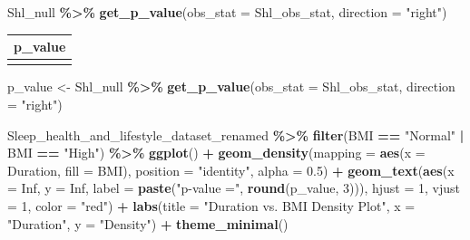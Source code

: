 \documentclass[
  11pt,
]{article}
\newenvironment{Shaded}{\begin{snugshade}}{\end{snugshade}}
\newcommand{\AttributeTok}[1]{\textcolor[rgb]{0.13,0.29,0.53}{#1}}
\newcommand{\ConstantTok}[1]{\textcolor[rgb]{0.56,0.35,0.01}{#1}}
\newcommand{\DecValTok}[1]{\textcolor[rgb]{0.00,0.00,0.81}{#1}}
\newcommand{\FloatTok}[1]{\textcolor[rgb]{0.00,0.00,0.81}{#1}}
\newcommand{\FunctionTok}[1]{\textcolor[rgb]{0.13,0.29,0.53}{\textbf{#1}}}
\newcommand{\NormalTok}[1]{#1}
\newcommand{\OtherTok}[1]{\textcolor[rgb]{0.56,0.35,0.01}{#1}}
\newcommand{\SpecialCharTok}[1]{\textcolor[rgb]{0.81,0.36,0.00}{\textbf{#1}}}
\newcommand{\StringTok}[1]{\textcolor[rgb]{0.31,0.60,0.02}{#1}}
\begin{document}
\begin{Shaded}
\begin{Highlighting}[]
\NormalTok{Shl\_null }\SpecialCharTok{\%\textgreater{}\%} \FunctionTok{get\_p\_value}\NormalTok{(}\AttributeTok{obs\_stat =}\NormalTok{ Shl\_obs\_stat, }\AttributeTok{direction =} \StringTok{"right"}\NormalTok{)}
\end{Highlighting}
\end{Shaded}

\begin{longtable}[]{@{}r@{}}
\toprule\noalign{}
p\_value \\
\midrule\noalign{}
\endhead
\bottomrule\noalign{}
\endlastfoot
1 \\
\end{longtable}

\begin{Shaded}
\begin{Highlighting}[]
\NormalTok{p\_value }\OtherTok{\textless{}{-}}\NormalTok{ Shl\_null }\SpecialCharTok{\%\textgreater{}\%} \FunctionTok{get\_p\_value}\NormalTok{(}\AttributeTok{obs\_stat =}\NormalTok{ Shl\_obs\_stat, }\AttributeTok{direction =} \StringTok{"right"}\NormalTok{)}
\end{Highlighting}
\end{Shaded}

\begin{Shaded}
\begin{Highlighting}[]
\NormalTok{Sleep\_health\_and\_lifestyle\_dataset\_renamed }\SpecialCharTok{\%\textgreater{}\%}
  \FunctionTok{filter}\NormalTok{(BMI }\SpecialCharTok{==} \StringTok{"Normal"} \SpecialCharTok{|}\NormalTok{ BMI }\SpecialCharTok{==} \StringTok{"High"}\NormalTok{) }\SpecialCharTok{\%\textgreater{}\%}
  \FunctionTok{ggplot}\NormalTok{() }\SpecialCharTok{+}
  \FunctionTok{geom\_density}\NormalTok{(}\AttributeTok{mapping =} \FunctionTok{aes}\NormalTok{(}\AttributeTok{x =}\NormalTok{ Duration, }\AttributeTok{fill =}\NormalTok{ BMI), }\AttributeTok{position =} \StringTok{"identity"}\NormalTok{, }\AttributeTok{alpha =} \FloatTok{0.5}\NormalTok{) }\SpecialCharTok{+}
  \FunctionTok{geom\_text}\NormalTok{(}\FunctionTok{aes}\NormalTok{(}\AttributeTok{x =} \ConstantTok{Inf}\NormalTok{, }\AttributeTok{y =} \ConstantTok{Inf}\NormalTok{, }\AttributeTok{label =} \FunctionTok{paste}\NormalTok{(}\StringTok{"p{-}value ="}\NormalTok{, }\FunctionTok{round}\NormalTok{(p\_value, }\DecValTok{3}\NormalTok{))),}
            \AttributeTok{hjust =} \DecValTok{1}\NormalTok{, }\AttributeTok{vjust =} \DecValTok{1}\NormalTok{, }\AttributeTok{color =} \StringTok{"red"}\NormalTok{) }\SpecialCharTok{+}
  \FunctionTok{labs}\NormalTok{(}\AttributeTok{title =} \StringTok{"Duration vs. BMI Density Plot"}\NormalTok{,}
       \AttributeTok{x =} \StringTok{"Duration"}\NormalTok{,}
       \AttributeTok{y =} \StringTok{"Density"}\NormalTok{) }\SpecialCharTok{+}
  \FunctionTok{theme\_minimal}\NormalTok{()}
\end{Highlighting}
\end{Shaded}
\end{document}
